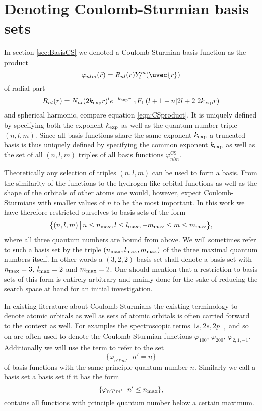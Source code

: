\section{Denoting Coulomb-Sturmian basis sets}
In section \vref{sec:BasisCS}
we denoted a Coulomb-Sturmian basis function as the product
\[
	\varphi_{nlm}(\vec{r}) = R_{nl}(r) Y_l^m(\uvec{r})
\]
of radial part 
\[
	R_{nl}(r) = N_{nl} (2k_\text{exp} r)^l e^{-k_\text{exp} r}
	\;_1F_1\left(l+1-n \middle| 2l+2 \middle|2k_\text{exp} r\right)
\]
and spherical harmonic, compare equation \eqref{eqn:CSproduct}.
It is uniquely defined by specifying both the \CS exponent $k_\text{exp}$
as well as the quantum number triple $(n,l,m)$.
Since all basis functions share the same exponent $k_\text{exp}$
a truncated \CS basis is thus uniquely defined by specifying
the common exponent $k_\text{exp}$ as well as the set of all $(n, l, m)$
triples of all basis functions $\varphi^\text{CS}_{nlm}$.

Theoretically any selection of triples $(n, l, m)$ can be used to form a \CS basis.
From the similarity of the \CS functions to the hydrogen-like orbital functions
as well as the shape of the orbitals of other atoms
one would, however, expect Coulomb-Sturmians with smaller values of $n$
to be the most important.
In this work we have therefore restricted ourselves to \CS basis sets
of the form
\[ \big\{ (n, l, m) \, \big| \, n \le n_\text{max}, l \le l_\text{max}, -m_\text{max} \le m \le m_\text{max} \big\}, \]
\ie where all three quantum numbers are bound from above.
We will sometimes refer to such a \CS basis set by the triple
$(n_\text{max}, l_\text{max}, m_\text{max})$ of the three maximal quantum numbers itself.
In other words a $(3,2,2)$-basis set shall denote a basis set with
$n_\text{max} = 3$, $l_\text{max} = 2$ and $m_\text{max} = 2$.
One should mention that a restriction to basis sets of this form
is entirely arbitrary
and mainly done for the sake of reducing the search space at hand
for an initial investigation.

In existing literature about Coulomb-Sturmians the existing terminology
to denote atomic orbitals as well as sets of atomic orbitals is often carried
forward to the \CS context as well.
For examples the spectroscopic terms $1s, 2s, 2p_{-1}$ and so on
are often used to denote the Coulomb-Sturmian functions
$\varphi_{100}$, $\varphi_{200}$, $\varphi_{2,1,-1}$.
Additionally we will use the term  to refer to the set
\[ \{ \varphi_{n'l'm'} \, | \, n' = n \} \]
of \CS basis functions with the same principle quantum number $n$.
Similarly we call a \CS basis set a  basis set
if it has the form
\[ \{ \varphi_{n'l'm'} \, | \, n' \leq n_\text{max} \}, \]
\ie contains all \CS functions with principle quantum number
below a certain maximum.
